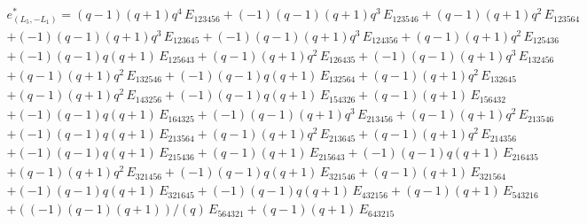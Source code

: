 \begin{multline*}
e^*_{(L_5, -L_1)} = 
  (q-1) (q+1) q^4\, E_{123456} + (-1) (q-1) (q+1) q^3\, E_{123546} + (q-1) (q+1) q^2\, E_{123564}
  \\
  + (-1) (q-1) (q+1) q^3\, E_{123645} + (-1) (q-1) (q+1) q^3\, E_{124356} + (q-1) (q+1) q^2\, E_{125436}
  \\
  + (-1) (q-1) q (q+1)\, E_{125643} + (q-1) (q+1) q^2\, E_{126435} + (-1) (q-1) (q+1) q^3\, E_{132456}
  \\
  + (q-1) (q+1) q^2\, E_{132546} + (-1) (q-1) q (q+1)\, E_{132564} + (q-1) (q+1) q^2\, E_{132645}
  \\
  + (q-1) (q+1) q^2\, E_{143256} + (-1) (q-1) q (q+1)\, E_{154326} + (q-1) (q+1)\, E_{156432}
  \\
  + (-1) (q-1) q (q+1)\, E_{164325} + (-1) (q-1) (q+1) q^3\, E_{213456} + (q-1) (q+1) q^2\, E_{213546}
  \\
  + (-1) (q-1) q (q+1)\, E_{213564} + (q-1) (q+1) q^2\, E_{213645} + (q-1) (q+1) q^2\, E_{214356}
  \\
  + (-1) (q-1) q (q+1)\, E_{215436} + (q-1) (q+1)\, E_{215643} + (-1) (q-1) q (q+1)\, E_{216435}
  \\
  + (q-1) (q+1) q^2\, E_{321456} + (-1) (q-1) q (q+1)\, E_{321546} + (q-1) (q+1)\, E_{321564}
  \\
  + (-1) (q-1) q (q+1)\, E_{321645} + (-1) (q-1) q (q+1)\, E_{432156} + (q-1) (q+1)\, E_{543216}
  \\
  + ((-1) (q-1) (q+1))/(q)\, E_{564321} + (q-1) (q+1)\, E_{643215}
\end{multline*}

